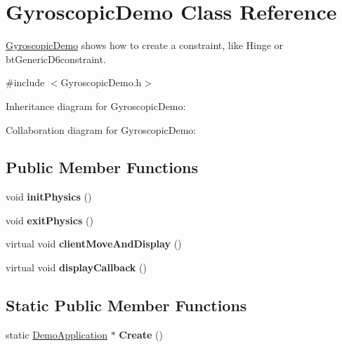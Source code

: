 \hypertarget{class_gyroscopic_demo}{\section{Gyroscopic\+Demo Class Reference}
\label{class_gyroscopic_demo}
}


\hyperlink{class_gyroscopic_demo}{Gyroscopic\+Demo} shows how to create a constraint, like Hinge or bt\+Generic\+D6constraint.  




{\ttfamily \#include $<$Gyroscopic\+Demo.\+h$>$}



Inheritance diagram for Gyroscopic\+Demo\+:


Collaboration diagram for Gyroscopic\+Demo\+:
\subsection*{Public Member Functions}
\begin{DoxyCompactItemize}
\item 
\hypertarget{class_gyroscopic_demo_a01e3485e1bec5e25e05c9140ac0ed086}{void {\bfseries init\+Physics} ()}\label{class_gyroscopic_demo_a01e3485e1bec5e25e05c9140ac0ed086}

\item 
\hypertarget{class_gyroscopic_demo_a7e48260dfad6a487b5901c523d94ca3f}{void {\bfseries exit\+Physics} ()}\label{class_gyroscopic_demo_a7e48260dfad6a487b5901c523d94ca3f}

\item 
\hypertarget{class_gyroscopic_demo_af4618755ef384b1cc168e63093a9b867}{virtual void {\bfseries client\+Move\+And\+Display} ()}\label{class_gyroscopic_demo_af4618755ef384b1cc168e63093a9b867}

\item 
\hypertarget{class_gyroscopic_demo_a0e44b19db7c81f6433469b3053ee1c6f}{virtual void {\bfseries display\+Callback} ()}\label{class_gyroscopic_demo_a0e44b19db7c81f6433469b3053ee1c6f}

\end{DoxyCompactItemize}
\subsection*{Static Public Member Functions}
\begin{DoxyCompactItemize}
\item 
\hypertarget{class_gyroscopic_demo_af93d4388b899f6b7968d38f3a2ae4524}{static \hyperlink{class_demo_application}{Demo\+Application} $\ast$ {\bfseries Create} ()}\label{class_gyroscopic_demo_af93d4388b899f6b7968d38f3a2ae4524}

\end{DoxyCompactItemize}



